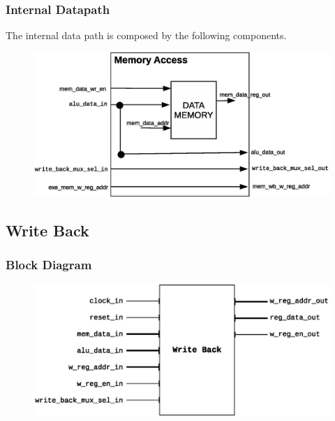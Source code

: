 \documentclass{article}
\begin{document}
  \subsubsection{Internal Datapath} 
  The internal data path is composed by the following components.

  \begin{figure}[H]
    \centering
    \includegraphics[width=\linewidth]{pictures/datapath/mem_datapath.eps}
  \end{figure}    
  
  \newpage
  \subsection{Write Back}
  \subsubsection{Block Diagram}
  \begin{figure}[H]
    \centering
    \includegraphics[width=\linewidth]{pictures/blocks/wb_block.eps}
  \end{figure} 
\end{document}
